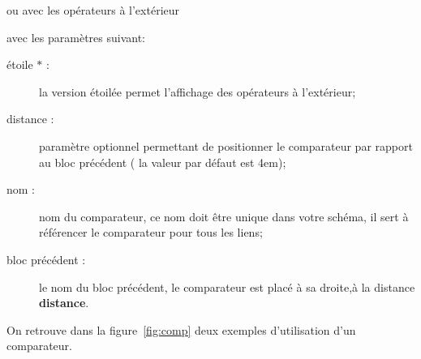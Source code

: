 \documentclass[a4paper,11pt]{article}                      %
\begin{document}
\begin{tikzexample}[title=Personnalisation des comparateurs ,   righthand width=0.5\textwidth,]
\end{tikzexample}

ou avec les opérateurs à l'extérieur

\begin{tikzexample}[title=Personnalisation des comparateurs ,   righthand width=0.5\textwidth,]
\end{tikzexample}
 avec les paramètres suivant:




\begin{description}
\item [étoile $*$ : ] la version étoilée permet l'affichage des opérateurs à l'extérieur;
\item [distance : ] paramètre optionnel permettant de positionner le comparateur par rapport au bloc précédent ( la valeur par défaut est 4em);
\item [nom :] nom du comparateur, ce nom doit être unique dans votre schéma, il sert à référencer le comparateur pour tous les liens;
\item [bloc précédent :] le nom du bloc précédent, le comparateur est placé à sa droite,à la distance \textbf{distance}.
\end{description}

On retrouve dans la figure~\ref{fig:comp} deux exemples d'utilisation d'un comparateur.
\end{document}
